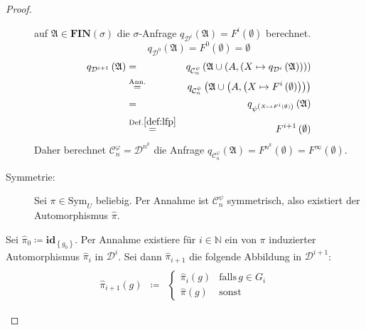 \begin{proof}
\begin{casenv}
\begin{description}
auf $\mathfrak{A}\in\mathbf{FIN}\left(\sigma\right)$ die $\sigma$-Anfrage
$q_{\mathcal{D}^{i}}\left(\mathfrak{A}\right)=F^{i}\left(\emptyset\right)$
berechnet.
\[
q_{\mathcal{D}^{0}}\left(\mathfrak{A}\right)=F^{0}\left(\emptyset\right)=\emptyset
\]
\begin{eqnarray*}
q_{\mathcal{D}^{i+1}}\left(\mathfrak{A}\right) & = & q_{\mathcal{C}_{n}^{\psi}}\left(\mathfrak{A}\cup\left(A,\left(X\mapsto q_{\mathcal{D}^{i}}\left(\mathfrak{A}\right)\right)\right)\right)\\
 & \overset{\mathrm{Ann.}}{=} & q_{\mathcal{C}_{n}^{\psi}}\left(\mathfrak{A}\cup\left(A,\left(X\mapsto F^{i}\left(\emptyset\right)\right)\right)\right)\\
 & = & q_{\psi^{\left(X\mapsto F^{i}\left(\emptyset\right)\right)}}\left(\mathfrak{A}\right)\\
 & \overset{\mathrm{Def.\ref{def:lfp}}}{=} & F^{i+1}\left(\emptyset\right)
\end{eqnarray*}
Daher berechnet $\mathcal{C}_{n}^{\varphi}=\mathcal{D}^{n^{k}}$ die
Anfrage $q_{\mathcal{C}_{n}^{\varphi}}\left(\mathfrak{A}\right)=F^{n^{k}}\left(\emptyset\right)=F^{\infty}\left(\emptyset\right)$.
\item [{Symmetrie:}] Sei $\pi\in\mathrm{Sym}_{U}$ beliebig. Per Annahme
ist $\mathcal{C}_{n}^{\psi}$ symmetrisch, also existiert der Automorphismus
$\hat{\pi}$.
\end{description}
Sei $\hat{\pi}_{0}\coloneqq\mathbf{id}_{\left\{ g_{0}\right\} }$.
Per Annahme existiere für $i\in\mathbb{N}$ ein von $\pi$ induzierter
Automorphismus $\hat{\pi}_{i}$ in $\mathcal{D}^{i}$. Sei dann $\hat{\pi}_{i+1}$
die folgende Abbildung in $\mathcal{D}^{i+1}$:
\begin{eqnarray*}
\\
\hat{\pi}_{i+1}\left(g\right) & \coloneqq & \begin{cases}
\hat{\pi}_{i}\left(g\right) & \mathrm{falls}\,g\in G_{i}\\
\hat{\pi}\left(g\right) & \mathrm{sonst}
\end{cases}
\end{eqnarray*}


\end{casenv}
\end{proof}
